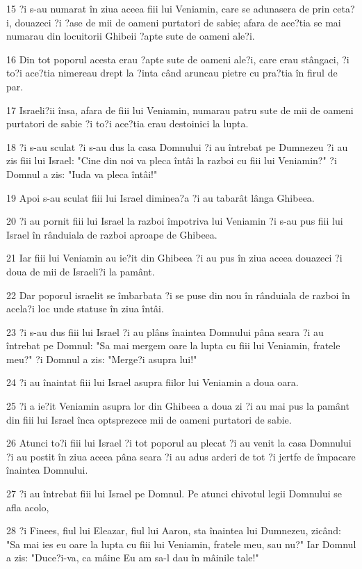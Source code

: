 \par 15 ?i s-au numarat în ziua aceea fiii lui Veniamin, care se adunasera de prin ceta?i, douazeci ?i ?ase de mii de oameni purtatori de sabie; afara de ace?tia se mai numarau din locuitorii Ghibeii ?apte sute de oameni ale?i.
\par 16 Din tot poporul acesta erau ?apte sute de oameni ale?i, care erau stângaci, ?i to?i ace?tia nimereau drept la ?inta când aruncau pietre cu pra?tia în firul de par.
\par 17 Israeli?ii însa, afara de fiii lui Veniamin, numarau patru sute de mii de oameni purtatori de sabie ?i to?i ace?tia erau destoinici la lupta.
\par 18 ?i s-au sculat ?i s-au dus la casa Domnului ?i au întrebat pe Dumnezeu ?i au zis fiii lui Israel: "Cine din noi va pleca întâi la razboi cu fiii lui Veniamin?" ?i Domnul a zis: "Iuda va pleca întâi!"
\par 19 Apoi s-au sculat fiii lui Israel diminea?a ?i au tabarât lânga Ghibeea.
\par 20 ?i au pornit fiii lui Israel la razboi împotriva lui Veniamin ?i s-au pus fiii lui Israel în rânduiala de razboi aproape de Ghibeea.
\par 21 Iar fiii lui Veniamin au ie?it din Ghibeea ?i au pus în ziua aceea douazeci ?i doua de mii de Israeli?i la pamânt.
\par 22 Dar poporul israelit se îmbarbata ?i se puse din nou în rânduiala de razboi în acela?i loc unde statuse în ziua întâi.
\par 23 ?i s-au dus fiii lui Israel ?i au plâns înaintea Domnului pâna seara ?i au întrebat pe Domnul: "Sa mai mergem oare la lupta cu fiii lui Veniamin, fratele meu?" ?i Domnul a zis: "Merge?i asupra lui!"
\par 24 ?i au înaintat fiii lui Israel asupra fiilor lui Veniamin a doua oara.
\par 25 ?i a ie?it Veniamin asupra lor din Ghibeea a doua zi ?i au mai pus la pamânt din fiii lui Israel înca optsprezece mii de oameni purtatori de sabie.
\par 26 Atunci to?i fiii lui Israel ?i tot poporul au plecat ?i au venit la casa Domnului ?i au postit în ziua aceea pâna seara ?i au adus arderi de tot ?i jertfe de împacare înaintea Domnului.
\par 27 ?i au întrebat fiii lui Israel pe Domnul. Pe atunci chivotul legii Domnului se afla acolo,
\par 28 ?i Finees, fiul lui Eleazar, fiul lui Aaron, sta înaintea lui Dumnezeu, zicând: "Sa mai ies eu oare la lupta cu fiii lui Veniamin, fratele meu, sau nu?" Iar Domnul a zis: "Duce?i-va, ca mâine Eu am sa-l dau în mâinile tale!"
